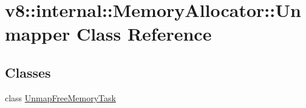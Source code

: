 \hypertarget{classv8_1_1internal_1_1MemoryAllocator_1_1Unmapper}{}\section{v8\+:\+:internal\+:\+:Memory\+Allocator\+:\+:Unmapper Class Reference}
\label{classv8_1_1internal_1_1MemoryAllocator_1_1Unmapper}
\subsection*{Classes}
\begin{DoxyCompactItemize}
\item 
class \mbox{\hyperlink{classv8_1_1internal_1_1MemoryAllocator_1_1Unmapper_1_1UnmapFreeMemoryTask}{Unmap\+Free\+Memory\+Task}}
\end{DoxyCompactItemize}

